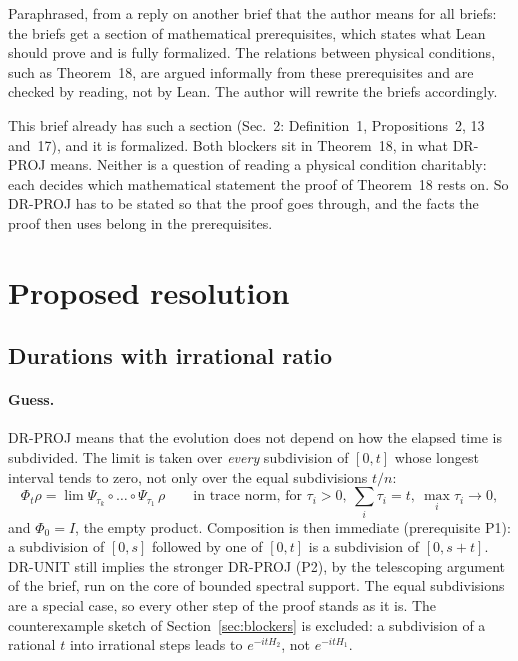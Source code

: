 \documentclass[11pt]{article}
\begin{document}
Paraphrased, from a reply on another brief that the author means for all briefs: the briefs get a
section of mathematical prerequisites, which states what Lean should prove and is fully
formalized. The relations between physical conditions, such as Theorem~18, are argued informally
from these prerequisites and are checked by reading, not by Lean. The author will rewrite the
briefs accordingly.

This brief already has such a section (Sec.~2: Definition~1, Propositions~2, 13 and~17), and it
is formalized. Both blockers sit in Theorem~18, in what DR-PROJ means. Neither is a question of
reading a physical condition charitably: each decides which mathematical statement the proof of
Theorem~18 rests on. So DR-PROJ has to be stated so that the proof goes through, and the facts
the proof then uses belong in the prerequisites.

\section{Proposed resolution}

\subsection{Durations with irrational ratio}

\paragraph{Guess.} DR-PROJ means that the evolution does not depend on how the elapsed time is
subdivided. The limit is taken over \emph{every} subdivision of $[0,t]$ whose longest interval
tends to zero, not only over the equal subdivisions $t/n$:
\[
  \Phi_t\rho = \lim \Psi_{\tau_{k}} \circ \dots \circ \Psi_{\tau_{1}}\,\rho
  \qquad\text{in trace norm, for } \tau_i > 0,\ \textstyle\sum_i \tau_i = t,\
  \max_i \tau_i \to 0,
\]
and $\Phi_0 = I$, the empty product. Composition is then immediate (prerequisite P1): a
subdivision of $[0,s]$ followed by one of $[0,t]$ is a subdivision of $[0,s+t]$. DR-UNIT still
implies the stronger DR-PROJ (P2), by the telescoping argument of the brief, run on the core of
bounded spectral support. The equal subdivisions are a special case, so every other step of the
proof stands as it is. The counterexample sketch of Section~\ref{sec:blockers} is excluded: a
subdivision of a rational $t$ into irrational steps leads to $e^{-itH_2}$, not $e^{-itH_1}$.
\end{document}
